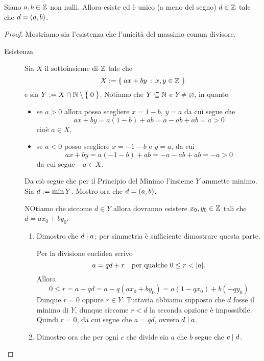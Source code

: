 \begin{theorem}
    Siano $a, b \in \mathbb{Z}$ non nulli. Allora esiste ed è unico (a meno del segno) $d \in \mathbb{Z}$ tale che $d = \left(a, b\right)$.
\end{theorem}
\begin{proof}
    Mostriamo sia l'esistenza che l'unicità del massimo comun divisore.
    \begin{description}
        \item[Esistenza] Sia $X$ il sottoinsieme di $\mathbb{Z}$ tale che \[
            X := \left\{\;ax + by \,:\, x, y \in \mathbb{Z}\;\right\}    
        \] e sia $Y := X \cap \mathbb{N} \setminus \left\{\;0\;\right\}$. Notiamo che $Y \subseteq \mathbb{N}$ e $Y \neq \varnothing$, in quanto \begin{itemize}
            \item se $a > 0$ allora posso scegliere $x = 1 - b$, $y = a$ da cui segue che \[
                ax + by = a(1-b)+ab = a - ab + ab = a > 0
            \] cioè $a \in X$,
            \item se $a < 0$ posso scegliere $x = - 1 - b$ e $y = a$, da cui \[
                ax + by = a(-1-b)+ab = -a - ab + ab = -a > 0 
            \] da cui segue $-a \in X$.
        \end{itemize}

        Da ciò segue che per il Principio del Minimo l'insieme $Y$ ammette minimo. Sia $d := \min Y$. Mostro ora che $d = \left(a, b\right)$.

        NOtiamo che siccome $d \in Y$ allora dovranno esistere $x_0, y_0 \in \mathbb{Z}$ tali che $d = ax_0 + by_0$.
        \begin{enumerate}[label={(\roman*)}]
            \item Dimostro che $d \mid a$; per simmetria è sufficiente dimostrare questa parte.
            
            Per la divisione euclidea scrivo \begin{equation}
                a = qd + r \quad \text{per qualche } 0 \leq r < \lvert a\rvert.
            \end{equation} Allora \begin{equation*}
                0 \leq r = a - qd = a - q(ax_0 + by_0) = a(1 - qx_0) + b(-qy_0)
            \end{equation*}
            Dunque $r = 0$ oppure $r \in Y$. Tuttavia abbiamo supposto che $d$ fosse il minimo di $Y$, dunque siccome $r < d$ la seconda opzione è impossibile. Quindi $r = 0$, da cui segue che $a = qd$, ovvero $d \mid a$.
            \item Dimostro ora che per ogni $c$ che divide sia $a$ che $b$ segue che $c \mid d$.
            

\end{enumerate}
\end{description}
\end{proof}

